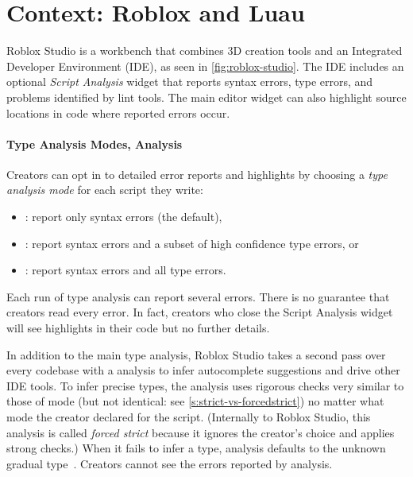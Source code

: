 \documentclass[english,submission,cleveref]{programming}
\begin{document}
\section{Context: {Roblox} and {Luau}}
\label{s:context}

% 
% 


{Roblox Studio} is a workbench that
combines {3D creation} tools and an Integrated
Developer Environment (IDE), as seen in \cref{fig:roblox-studio}.
The IDE includes an optional \emph{Script Analysis} widget that
reports syntax errors, type errors, and problems identified by
lint tools. The main editor widget can also highlight
source locations in code where reported errors occur.


\paragraph{Type Analysis Modes, \FS{} Analysis}

Creators can opt in to detailed error reports and highlights by
choosing a \emph{type analysis mode} for each script they write:
\begin{itemize}
  \item \mnocheck{}: report only syntax errors (the default),
  \item \mnonstrict{}: report syntax errors and a subset of high confidence type errors, or
  \item \mstrict{}: report syntax errors and all type errors.
\end{itemize}
Each run of type analysis can report several errors.
There is no guarantee that creators read every error.
In fact, creators who close the Script Analysis widget
will see highlights in their code but no further details.

In addition to the main type analysis, Roblox Studio takes a second pass over
every codebase with a \emph{\FS{}} analysis to infer autocomplete suggestions
and drive other IDE tools.
To infer precise types,
the \FS{} analysis uses rigorous checks very similar to those of
\mstrict{} mode (but not identical: see \cref{s:strict-vs-forcedstrict})
no matter what mode the creator declared for the script.
(Internally to Roblox Studio, this analysis is called \emph{forced strict}
because it ignores the creator's choice and applies strong checks.)
When it fails to infer a type, \FS{} analysis defaults to the unknown gradual
type~\cite{st-sfp-2006}.
Creators cannot see the errors reported by \FS{} analysis.
\end{document}
